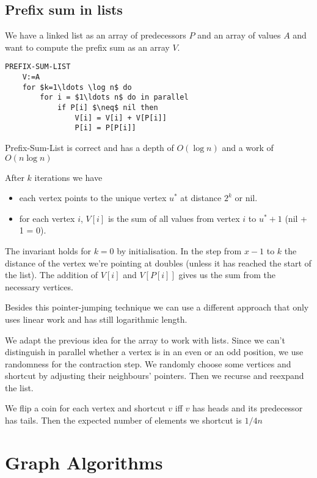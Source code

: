 \subsection{Prefix sum in lists}
We have a linked list as an array of predecessors $P$ and an array of values $A$ and want to compute the prefix sum as an array $V$.

\begin{lstlisting}
PREFIX-SUM-LIST
	V:=A
	for $k=1\ldots \log n$ do
		for i = $1\ldots n$ do in parallel
			if P[i] $\neq$ nil then
				V[i] = V[i] + V[P[i]]
				P[i] = P[P[i]]
\end{lstlisting}

\begin{thm} Prefix-Sum-List is correct and has a depth of $O(\log n)$ and a work of $O(n\log n)$\end{thm}

\begin{pr}After $k$ iterations we have
\begin{itemize}
\item each vertex points to the unique vertex $u^*$ at distance $2^k$ or nil.
\item for each vertex $i$, $V[i]$ is the sum of all values from vertex $i$ to $u^*+1$ (nil + 1 = 0). 
\end{itemize}

The invariant holds for $k=0$ by initialisation. In the step from $x-1$ to $k$ the distance of the vertex we're pointing at doubles (unless it has reached the start of the list). The addition of $V[i]$ and $V[P[i]]$ gives us the sum from the necessary vertices.
\end{pr}

Besides this pointer-jumping technique we can use a different approach that only uses linear work and has still logarithmic length.

We adapt the previous idea for the array to work with lists. Since we can't distinguish in parallel whether a vertex is in an even or an odd position, we use randomness for the contraction step. We randomly choose some vertices and shortcut by adjusting their neighbours' pointers. Then we recurse and reexpand the list.

We flip a coin for each vertex and shortcut $v$ iff $v$ has heads and its predecessor has tails. Then the expected number of elements we shortcut is $1/4n$

\section{Graph Algorithms}

